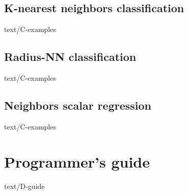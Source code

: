 \documentclass[epsbased,copyleft,final,loe, lof,extendedindex,firstnumbered,tfg,english]{tfgtfmthesisuam}
\begin{document}
	\section{K-nearest neighbors classification\label{EX:KNN}}{text/C-examples}
	\section{Radius-NN classification\label{EX:RNN}}{text/C-examples}
	\section{Neighbors scalar regression\label{EX:SCALARREG}}{text/C-examples}

\chapter{Programmer’s guide\label{CAP:GUIDE}}{text/D-guide}
\end{document}
